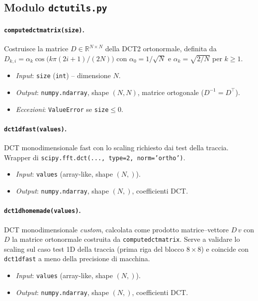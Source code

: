\documentclass[11pt,a4paper]{article}
\makeatletter
\let\@origtexttt\texttt
\renewcommand{\texttt}[1]{{\def\_{\textunderscore\discretionary{}{}{}}\@origtexttt{#1}}}
\makeatother
\begin{document}
\subsection{Modulo \texttt{dct\_utils.py}}

\paragraph{\texttt{compute\_dct\_matrix(size)}.}
Costruisce la matrice $D\in\mathbb{R}^{N\times N}$ della DCT2 ortonormale,
definita da $D_{k,i}=\alpha_k\cos\!\bigl(k\pi(2i+1)/(2N)\bigr)$ con
$\alpha_0=1/\sqrt{N}$ e $\alpha_k=\sqrt{2/N}$ per $k\ge 1$.
\begin{itemize}
  \item \emph{Input}: \texttt{size} (\texttt{int}) -- dimensione $N$.
  \item \emph{Output}: \texttt{numpy.ndarray}, shape $(N,N)$, matrice ortogonale
        ($D^{-1}=D^\top$).
  \item \emph{Eccezioni}: \texttt{ValueError} se \texttt{size}$\le 0$.
\end{itemize}

\paragraph{\texttt{dct\_1d\_fast(values)}.}
DCT monodimensionale fast con lo scaling richiesto dai test della traccia.
Wrapper di \texttt{scipy.fft.dct(..., type=2, norm='ortho')}.
\begin{itemize}
  \item \emph{Input}: \texttt{values} (array-like, shape $(N,)$).
  \item \emph{Output}: \texttt{numpy.ndarray}, shape $(N,)$, coefficienti DCT.
\end{itemize}

\paragraph{\texttt{dct\_1d\_homemade(values)}.}
DCT monodimensionale \emph{custom}, calcolata come prodotto matrice--vettore
$D\,v$ con $D$ la matrice ortonormale costruita da \texttt{compute\_dct\_matrix}.
Serve a validare lo scaling sul caso test 1D della traccia (prima riga del
blocco $8\times8$) e coincide con \texttt{dct\_1d\_fast} a meno della precisione
di macchina.
\begin{itemize}
  \item \emph{Input}: \texttt{values} (array-like, shape $(N,)$).
  \item \emph{Output}: \texttt{numpy.ndarray}, shape $(N,)$, coefficienti DCT.
\end{itemize}
\end{document}
